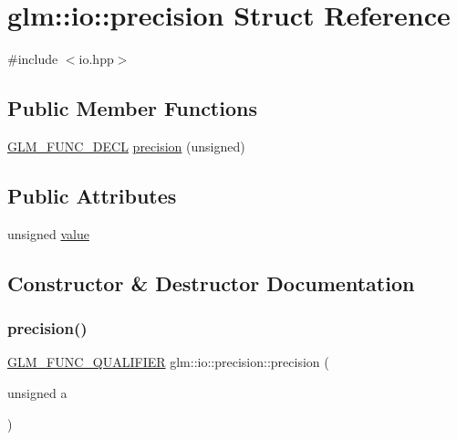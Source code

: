 \hypertarget{structglm_1_1io_1_1precision}{}\section{glm\+:\+:io\+:\+:precision Struct Reference}
\label{structglm_1_1io_1_1precision}


{\ttfamily \#include $<$io.\+hpp$>$}

\subsection*{Public Member Functions}
\begin{DoxyCompactItemize}
\item 
\hyperlink{setup_8hpp_ab2d052de21a70539923e9bcbf6e83a51}{G\+L\+M\+\_\+\+F\+U\+N\+C\+\_\+\+D\+E\+CL} \hyperlink{structglm_1_1io_1_1precision_aa359e1766fd74b88e049d5449d521447}{precision} (unsigned)
\end{DoxyCompactItemize}
\subsection*{Public Attributes}
\begin{DoxyCompactItemize}
\item 
unsigned \hyperlink{structglm_1_1io_1_1precision_a43da772dff9a209768c63f1220d52074}{value}
\end{DoxyCompactItemize}


\subsection{Constructor \& Destructor Documentation}
\mbox{\label{structglm_1_1io_1_1precision_aa359e1766fd74b88e049d5449d521447}} 
\subsubsection{\texorpdfstring{precision()}{precision()}}
{\footnotesize\ttfamily \hyperlink{setup_8hpp_a33fdea6f91c5f834105f7415e2a64407}{G\+L\+M\+\_\+\+F\+U\+N\+C\+\_\+\+Q\+U\+A\+L\+I\+F\+I\+ER} glm\+::io\+::precision\+::precision (\begin{DoxyParamCaption}\item[{unsigned}]{a }\end{DoxyParamCaption})\hspace{0.3cm}{\ttfamily [explicit]}}




